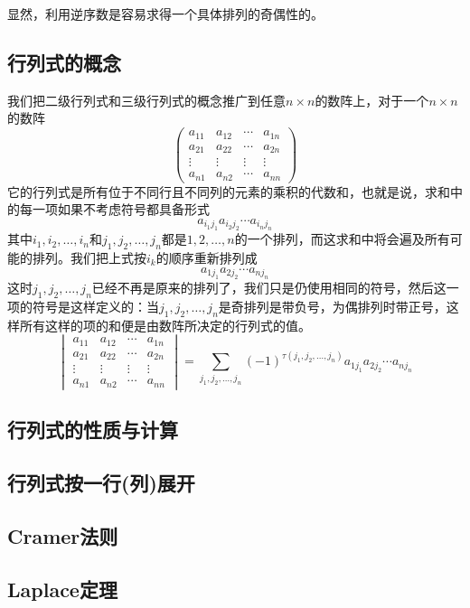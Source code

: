 显然，利用逆序数是容易求得一个具体排列的奇偶性的。

\subsection{行列式的概念}
\label{sec:determinant-concept}

我们把二级行列式和三级行列式的概念推广到任意$n\times n$的数阵上，对于一个$n \times n$的数阵
\[
  \begin{pmatrix}
    a_{11} & a_{12} & \cdots & a_{1n} \\
    a_{21} & a_{22} & \cdots & a_{2n} \\
    \vdots & \vdots & \vdots & \vdots \\
    a_{n1} & a_{n2} & \cdots & a_{nn}
  \end{pmatrix}
\]
它的行列式是所有位于不同行且不同列的元素的乘积的代数和，也就是说，求和中的每一项如果不考虑符号都具备形式
\[ a_{i_1j_1}a_{i_2j_2} \cdots a_{i_nj_n} \]
其中$i_1,i_2,\ldots,i_n$和$j_1,j_2,\ldots,j_n$都是$1,2,\ldots,n$的一个排列，而这求和中将会遍及所有可能的排列。我们把上式按$i_k$的顺序重新排列成
\[ a_{1j_1}a_{2j_2} \cdots a_{nj_n} \]
这时$j_1,j_2,\ldots,j_n$已经不再是原来的排列了，我们只是仍使用相同的符号，然后这一项的符号是这样定义的：当$j_1,j_2,\ldots,j_n$是奇排列是带负号，为偶排列时带正号，这样所有这样的项的和便是由数阵所决定的行列式的值。
\[
  \begin{vmatrix}
    a_{11} & a_{12} & \cdots & a_{1n} \\
    a_{21} & a_{22} & \cdots & a_{2n} \\
    \vdots & \vdots & \vdots & \vdots \\
    a_{n1} & a_{n2} & \cdots & a_{nn}
  \end{vmatrix}
  = \sum_{j_1,j_2,\ldots,j_n} (-1)^{\tau (j_1,j_2,\ldots,j_n)} a_{1j_1}a_{2j_2} \cdots a_{nj_n}
\]

\subsection{行列式的性质与计算}
\label{sec:determinant-properties}

\subsection{行列式按一行(列)展开}
\label{sec:determinant-expand-by-row-or-column}

\subsection{Cramer法则}
\label{sec:cramer-rule}

\subsection{Laplace定理}
\label{sec:laplace-theorem}




